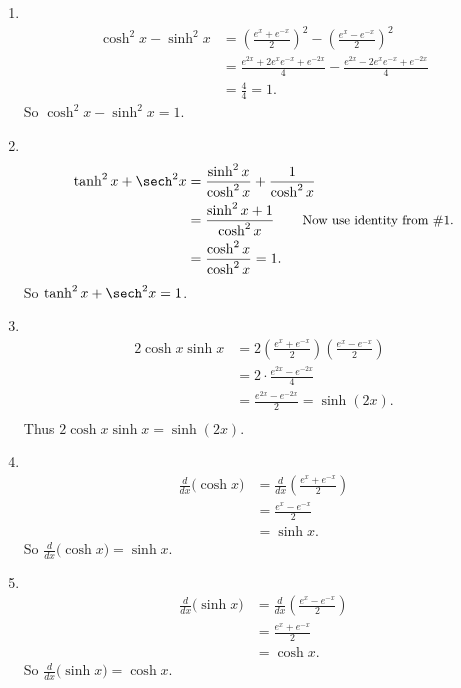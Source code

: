 {\begin{enumerate}
\item \mbox{}\\[-3\baselineskip]
\begin{align*}
 \cosh^2x-\sinh^2x
 &= \left(\frac{e^x+e^{-x}}2\right)^2 -\left(\frac{e^x-e^{-x}}2\right)^2\\
 &= \frac{e^{2x}+2e^xe^{-x} + e^{-2x}}4 - \frac{e^{2x}-2e^xe^{-x} + e^{-2x}}4\\
 &= \frac44=1.
\end{align*}
So $\cosh^2 x-\sinh^2x=1$.

\item	\mbox{}\\[-3\baselineskip]
\begin{align*}
 \tanh^2 x+\sech^2 x
 &=\frac{\sinh^2x}{\cosh^2 x} + \frac{1}{\cosh^2 x} \\
 &= \frac{\sinh^2x+1}{\cosh^2 x}\qquad \text{\small Now use identity from \#1.}\\
 &= \frac{\cosh^2 x}{\cosh^2 x} = 1.
\end{align*}
So $\tanh^2 x+\sech^2 x=1$.

\item \mbox{}\\[-3\baselineskip]
\begin{align*}
	2\cosh x\sinh x
	&= 2\left(\frac{e^x+e^{-x}}2\right)\left(\frac{e^x-e^{-x}}2\right) \\
	&= 2 \cdot\frac{e^{2x} - e^{-2x}}4\\
	&= \frac{e^{2x} - e^{-2x}}2 = \sinh (2x).\\
\end{align*}
Thus $2\cosh x\sinh x = \sinh (2x)$.

\item \mbox{}\\[-3\baselineskip]
\begin{align*}
	\frac{d}{dx}\big(\cosh x\big)
	&= \frac{d}{dx}\left(\frac{e^x+e^{-x}}2\right) \\
	&= \frac{e^x-e^{-x}}2\\
	&= \sinh x.
\end{align*}
So $\frac{d}{dx}\big(\cosh x\big) = \sinh x.$
	
\item  \mbox{}\\[-3\baselineskip]
\begin{align*}
	\frac{d}{dx}\big(\sinh x\big)
	&= \frac{d}{dx}\left(\frac{e^x-e^{-x}}2\right) \\
	&= \frac{e^x+e^{-x}}2\\
	&= \cosh x.
\end{align*}
So $\frac{d}{dx}\big(\sinh x\big) = \cosh x.$


\end{enumerate}}
